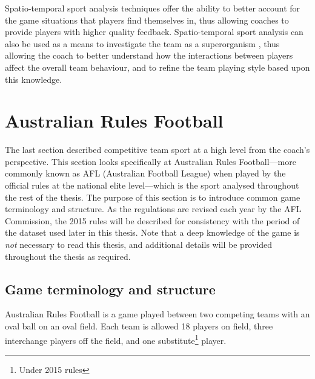 Spatio-temporal sport analysis techniques offer the ability to better account for the game situations that players find themselves in, thus allowing coaches to provide players with higher quality feedback. Spatio-temporal sport analysis can also be used as a means to investigate the team as a superorganism \cite{Duarte2012}, thus allowing the coach to better understand how the interactions between players affect the overall team behaviour, and to refine the team playing style based upon this knowledge.

\section{Australian Rules Football}
\label{sec:information-available-to-coaches}

The last section described competitive team sport at a high level from the coach's perspective. This section looks specifically at Australian Rules Football---more commonly known as AFL (Australian Football League) when played by the official rules at the national elite level---which is the sport analysed throughout the rest of the thesis. The purpose of this section is to introduce common game terminology and structure. As the regulations are revised each year by the AFL Commission, the 2015 rules will be described for consistency with the period of the dataset used later in this thesis. Note that a deep knowledge of the game is \textit{not} necessary to read this thesis, and additional details will be provided throughout the thesis as required.

\subsection{Game terminology and structure}

Australian Rules Football is a game played between two competing teams with an oval ball on an oval field. Each team is allowed 18
players on field, three interchange players off the field, and one substitute\footnote{Under 2015 rules} player.

